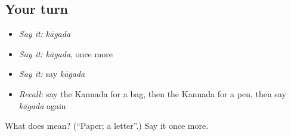 \subsection*{Your turn}
\begin{itemize}
\raggedright
  \item \emph{Say it:} \emph{kāgada}
  \item \emph{Say it:} \emph{kāgada}, once more
  \item \emph{Say it:} say \emph{kāgada}
  \item \emph{Recall:} say the Kannada for a bag, then the Kannada for a pen, then say \emph{kāgada} again
\end{itemize}

\begin{tcolorbox}[breakable,colback=teal!4,colframe=teal!35!black,title={Before you move on}]
What does  mean? (\textquotedblleft{}Paper; a letter\textquotedblright{}.) Say it once more.
\end{tcolorbox}
